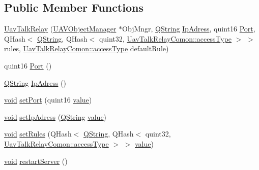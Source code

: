 \subsection*{Public Member Functions}
\begin{DoxyCompactItemize}
\item 
\hyperlink{group___u_a_v_talk_gac8b1e7722bbeccbae7c3dcea8d1fe222}{Uav\-Talk\-Relay} (\hyperlink{class_u_a_v_object_manager}{U\-A\-V\-Object\-Manager} $\ast$Obj\-Mngr, \hyperlink{group___u_a_v_objects_plugin_gab9d252f49c333c94a72f97ce3105a32d}{Q\-String} \hyperlink{group___u_a_v_talk_ga8f99b1f0add7784e3aad75a0784728bb}{Ip\-Adress}, quint16 \hyperlink{group___u_a_v_talk_gaa880d4612e6112e7a8c320cca690f31a}{Port}, Q\-Hash$<$ \hyperlink{group___u_a_v_objects_plugin_gab9d252f49c333c94a72f97ce3105a32d}{Q\-String}, Q\-Hash$<$ quint32, \hyperlink{group___u_a_v_talk_plugin_gae73e1677650d617d825cf2224fa0626a}{Uav\-Talk\-Relay\-Comon\-::access\-Type} $>$ $>$ rules, \hyperlink{group___u_a_v_talk_plugin_gae73e1677650d617d825cf2224fa0626a}{Uav\-Talk\-Relay\-Comon\-::access\-Type} default\-Rule)
\item 
quint16 \hyperlink{group___u_a_v_talk_gaa880d4612e6112e7a8c320cca690f31a}{Port} ()
\item 
\hyperlink{group___u_a_v_objects_plugin_gab9d252f49c333c94a72f97ce3105a32d}{Q\-String} \hyperlink{group___u_a_v_talk_ga8f99b1f0add7784e3aad75a0784728bb}{Ip\-Adress} ()
\item 
\hyperlink{group___u_a_v_objects_plugin_ga444cf2ff3f0ecbe028adce838d373f5c}{void} \hyperlink{group___u_a_v_talk_ga5ef623c050c9d1a65536f7de2eeda738}{set\-Port} (quint16 \hyperlink{glext_8h_aa0e2e9cea7f208d28acda0480144beb0}{value})
\item 
\hyperlink{group___u_a_v_objects_plugin_ga444cf2ff3f0ecbe028adce838d373f5c}{void} \hyperlink{group___u_a_v_talk_gaae8733ac23163492f5ea685cc69950ca}{set\-Ip\-Adress} (\hyperlink{group___u_a_v_objects_plugin_gab9d252f49c333c94a72f97ce3105a32d}{Q\-String} \hyperlink{glext_8h_aa0e2e9cea7f208d28acda0480144beb0}{value})
\item 
\hyperlink{group___u_a_v_objects_plugin_ga444cf2ff3f0ecbe028adce838d373f5c}{void} \hyperlink{group___u_a_v_talk_ga61c935860a7d4f77e40c58c10557eed4}{set\-Rules} (Q\-Hash$<$ \hyperlink{group___u_a_v_objects_plugin_gab9d252f49c333c94a72f97ce3105a32d}{Q\-String}, Q\-Hash$<$ quint32, \hyperlink{group___u_a_v_talk_plugin_gae73e1677650d617d825cf2224fa0626a}{Uav\-Talk\-Relay\-Comon\-::access\-Type} $>$ $>$ \hyperlink{glext_8h_aa0e2e9cea7f208d28acda0480144beb0}{value})
\item 
\hyperlink{group___u_a_v_objects_plugin_ga444cf2ff3f0ecbe028adce838d373f5c}{void} \hyperlink{group___u_a_v_talk_gac7de28de1557a197ee88c192917bca40}{restart\-Server} ()
\end{DoxyCompactItemize}



